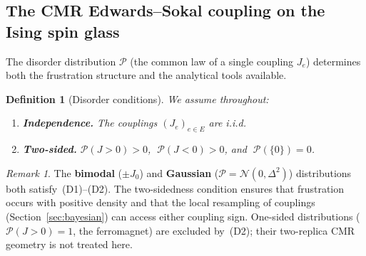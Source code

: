 \documentclass[11pt]{article}
\newtheorem{definition}[theorem]{Definition}
\numberwithin{theorem}{section}
\theoremstyle{remark}
\newtheorem{remark}[theorem]{Remark}
\begin{document}
\subsection{The CMR Edwards--Sokal coupling on the Ising spin glass}

The disorder distribution $\mathscr{P}$ (the common law of a single coupling $J_e$) determines both the frustration structure and the analytical tools available.

\begin{definition}[Disorder conditions]\label{def:disorder}
We assume throughout:
\begin{enumerate}
\item[\textup{(D1)}] \textbf{Independence.} The couplings $(J_e)_{e \in E}$ are i.i.d.
\item[\textup{(D2)}] \textbf{Two-sided.} $\mathscr{P}(J > 0) > 0$, $\;\mathscr{P}(J < 0) > 0$, and $\;\mathscr{P}(\{0\}) = 0$.
\end{enumerate}
\end{definition}

\begin{remark}
The \textbf{bimodal} ($\pm J_0$) and \textbf{Gaussian} ($\mathscr{P} = \mathcal{N}(0, \Delta^2)$) distributions both satisfy~(D1)--(D2).
The two-sidedness condition ensures that frustration occurs with positive density and that the local resampling of couplings (Section~\ref{sec:bayesian}) can access either coupling sign.
One-sided distributions ($\mathscr{P}(J > 0) = 1$, the ferromagnet) are excluded by~(D2); their two-replica CMR geometry is not treated here.
\end{remark}
\end{document}
